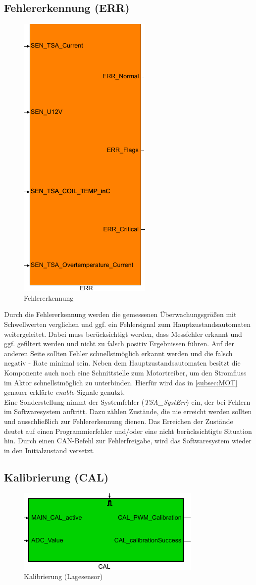 \subsection{Fehlererkennung (ERR)}\label{err}
\begin{figure}[H]%
\centering
\includegraphics[width=0.25\columnwidth]{./Bilder/fig_err}%
\caption{Fehlererkennung}%
\label{fig_err}%
\end{figure}
Durch die Fehlererkennung werden die gemessenen Überwachungsgrößen mit Schwellwerten verglichen und ggf. ein Fehlersignal zum Hauptzustandsautomaten weitergeleitet. Dabei muss berücksichtigt werden, dass Messfehler erkannt und ggf. gefiltert werden und nicht zu falsch positiv Ergebnissen führen. Auf der anderen Seite sollten Fehler schnellstmöglich erkannt werden und die falsch negativ - Rate minimal sein. Neben dem Hauptzustandsautomaten besitzt die Komponente auch noch eine Schnittstelle zum Motortreiber, um den Stromfluss im Aktor schnellstmöglich zu unterbinden. Hierfür wird das in \autoref{subsec:MOT} genauer erklärte \textit{enable}-Signale genutzt. \\
Eine Sonderstellung nimmt der Systemfehler (\textit{TSA\_SystErr}) ein, der bei Fehlern im Softwaresystem auftritt. Dazu zählen Zustände, die nie erreicht werden sollten und ausschließlich zur Fehlererkennung dienen. Das Erreichen der Zustände deutet auf einen Programmierfehler und/oder eine nicht berücksichtigte Situation hin. Durch einen CAN-Befehl zur Fehlerfreigabe, wird das Softwaresystem wieder in den Initialzustand versetzt.

\subsection{Kalibrierung (CAL)}

\begin{figure}[H]%
\centering
\includegraphics[width=0.35\columnwidth]{./Bilder/fig_cal}%
\caption{Kalibrierung (Lagesensor)}%
\label{fig_cal}%
\end{figure}

